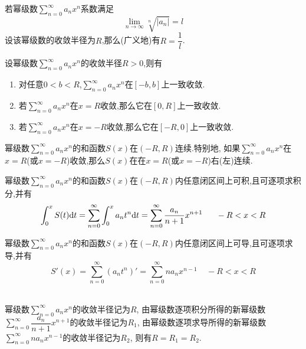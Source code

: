 \documentclass{ctexart}
\begin{document}
\begin{formal}[2.2 基于Cauchy判别法的收敛半径求法]
    若幂级数$\displaystyle\sum_{n=0}^\infty a_nx^n$系数满足
    \[\lim_{n\to\infty}\sqrt[n]{\left|a_n\right|}=l\]
    设该幂级数的收敛半径为$R$,那么(广义地)有$R=\dfrac1l$.
\end{formal}\noindent
{}
\begin{formal}[3.1 幂级数的内闭一致性]
    设幂级数$\displaystyle\sum_{n=0}^\infty a_nx^n$的收敛半径$R>0$,则有
    \begin{enumerate}[label=\tbf{\arabic*.}]
        \item 对任意$0<b<R$,$\displaystyle\sum_{n=0}^\infty a_nx^n$在$[-b,b]$上一致收敛.
        \item 若$\displaystyle\sum_{n=0}^\infty a_nx^n$在$x=R$收敛,那么它在$[0,R]$上一致收敛.
        \item 若$\displaystyle\sum_{n=0}^\infty a_nx^n$在$x=-R$收敛,那么它在$[-R,0]$上一致收敛.
    \end{enumerate}
\end{formal}
\begin{formal}[3.2 幂级数的连续性]
    幂级数$\displaystyle\sum_{n=0}^\infty a_nx^n$的和函数$S(x)$在$(-R,R)$连续.特别地,%
    如果$\displaystyle\sum_{n=0}^\infty a_nx^n$在$x=R$(或$x=-R$)收敛,那么$S(x)$在在$x=R$(或$x=-R$)右(左)连续.
\end{formal}
\begin{formal}[3.3 幂级数的和函数的逐项积分]
    幂级数$\displaystyle\sum_{n=0}^\infty a_nx^n$的和函数$S(x)$在$(-R,R)$内任意闭区间上可积,且可逐项求积分,并有
    \[\int_0^xS(t)\di t=\sum_{n=0}^\infty\int_0^xa_nt^n\di t=\sum_{n=0}^\infty\dfrac{a_n}{n+1}x^{n+1}\ \ \ \ \ -R<x<R\]
\end{formal}
\begin{formal}[3.4 幂级数的和函数的逐项求导]
    幂级数$\displaystyle\sum_{n=0}^\infty a_nx^n$的和函数$S(x)$在$(-R,R)$内任意闭区间上可导,且可逐项求导,并有
    \[S'(x)=\sum_{n=0}^\infty\left(a_nt^n\right)'=\sum_{n=0}^\infty na_nx^{n-1}\ \ \ \ \ -R<x<R\]
\end{formal}
\begin{lemma}\\
    幂级数$\displaystyle\sum_{n=0}^\infty a_nx^n$的收敛半径记为$R$,%
    由幂级数逐项积分所得的新幂级数$\displaystyle\sum_{n=0}^\infty\dfrac{a_n}{n+1}x^{n+1}$的收敛半径记为$R_1$,%
    由幂级数逐项求导所得的新幂级数$\displaystyle\sum_{n=0}^\infty na_nx^{n-1}$的收敛半径记为$R_2$,%
    则有$R=R_1=R_2$.
\end{lemma}
\noindent{}\\
\end{document}
